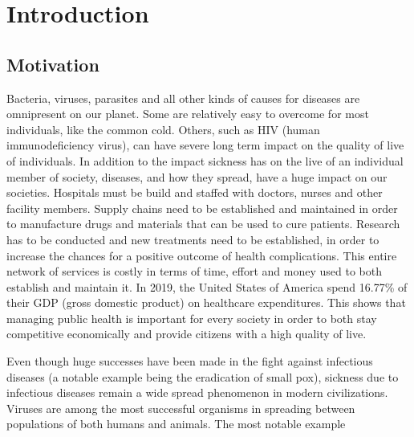 
\chapter{Introduction} %

\label{chap:introduction} %


\section{Motivation}
Bacteria, viruses, parasites and all other kinds of causes for diseases are omnipresent on our planet\cite{??}. Some are
relatively easy to overcome for most individuals, like the common cold\cite{??}. Others, such as HIV (human immunodeficiency virus),
can have severe long term impact on the quality of live of individuals\cite{??}. In addition to the impact sickness has
on the live of an individual member of society, diseases, and how they spread, have a huge impact on our societies. Hospitals must
be build and staffed with doctors, nurses and other facility members. Supply chains need to be established and maintained in order
to manufacture drugs and materials that can be used to cure patients. Research has to be conducted and new treatments need to be
established, in order to increase the chances for a positive outcome of health complications. This entire network of services is
costly in terms of time, effort  and money used to both establish and maintain it. In 2019, the United States of America spend
16.77\% of their GDP (gross domestic product) on healthcare expenditures\cite{WHO site}. This shows that managing public health
is important for every society in order to both stay competitive economically and provide citizens with a high quality of live.\newline
\par
Even though huge successes have been made in the fight against infectious diseases (a notable example being the eradication of
small pox\cite{??}), sickness due to infectious diseases remain a wide spread phenomenon in modern civilizations. Viruses are
among the most successful organisms in spreading between populations of both humans and animals\cite{??}. The most notable example
